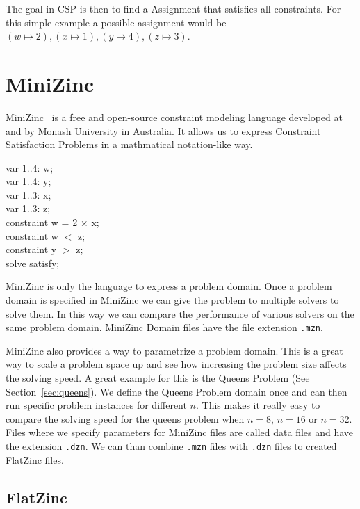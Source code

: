 The goal in CSP is then to find a Assignment that satisfies all constraints. For this simple example a possible assignment would be $(w \mapsto 2), (x \mapsto 1), (y \mapsto 4), (z \mapsto 3)$.

\section{MiniZinc}

MiniZinc~\cite{minizinc:2007} is a free and open-source constraint modeling language developed at and by Monash University in Australia. It allows us to express Constraint Satisfaction Problems in a mathmatical notation-like way.

\begin{tcolorbox}[title=MiniZinc example]
	var 1..4: w; \\
	var 1..4: y; \\
	var 1..3: x; \\
	var 1..3: z; \\

	constraint w = 2 $\times$ x; \\
	constraint w $<$ z; \\
	constraint y $>$ z; \\

	solve satisfy;
\end{tcolorbox}

MiniZinc is only the language to express a problem domain. Once a problem domain is specified in MiniZinc we can give the problem to multiple solvers to solve them. In this way we can compare the performance of various solvers on the same problem domain. MiniZinc Domain files have the file extension \verb|.mzn|.

MiniZinc also provides a way to parametrize a problem domain. This is a great way to scale a problem space up and see how increasing the problem size affects the solving speed. A great example for this is the Queens Problem (See Section~\ref{sec:queens}). We define the Queens Problem domain once and can then run specific problem instances for different $n$. This makes it really easy to compare the solving speed for the queens problem when $n = 8$, $n = 16$ or $n = 32$. Files where we specify parameters for MiniZinc files are called data files and have the extension \verb|.dzn|. We can than combine \verb|.mzn| files with \verb|.dzn| files to created FlatZinc files.

\subsection{FlatZinc}

